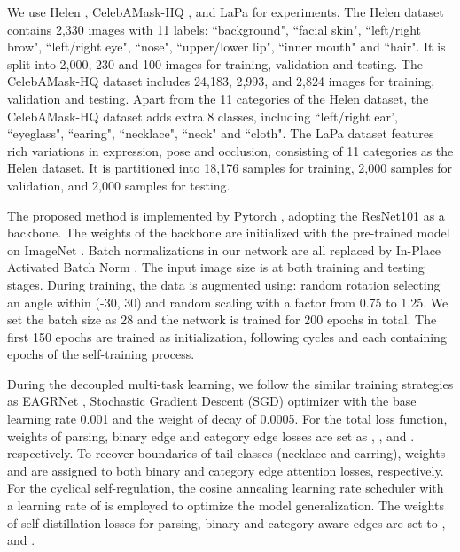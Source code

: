 \documentclass[10pt,twocolumn,letterpaper]{article}
\begin{document}
We use Helen \cite{helen}, CelebAMask-HQ \cite{CelebAMask-HQ}, and LaPa \cite{lapa} for experiments. The Helen dataset contains 2,330 images with 11 labels: ``background", ``facial skin", ``left/right brow", ``left/right eye", ``nose", ``upper/lower lip", ``inner mouth" and ``hair". It is split into 2,000, 230 and 100 images for training, validation and testing. The CelebAMask-HQ dataset includes 24,183, 2,993, and 2,824  images for training, validation and testing. Apart from the 11 categories of the Helen dataset, the CelebAMask-HQ dataset adds extra 8 classes, including ``left/right ear', ``eyeglass", ``earing", ``necklace", ``neck" and ``cloth". The LaPa dataset features rich variations in expression, pose and occlusion, consisting of 11 categories as the Helen dataset. It is partitioned into 18,176 samples for training, 2,000 samples for validation, and 2,000 samples for testing.


The proposed method is implemented by Pytorch \cite{pytorch}, adopting the ResNet101 \cite{resnet101} as a backbone. The weights of the backbone are initialized with the pre-trained model on ImageNet \cite{imagenet}. Batch normalizations in our network are all replaced by In-Place Activated Batch Norm \cite{inplace}. The input image size is  at both training and testing stages. During training, the data is augmented using: random rotation selecting an angle within (-30\textdegree, 30\textdegree) and random scaling with a factor from 0.75 to 1.25. We set the batch size as 28 and the network is trained for 200 epochs in total. The first 150 epochs are trained as initialization, following  cycles and each containing  epochs of the self-training process. 

During the decoupled multi-task learning, we follow the similar training strategies as EAGRNet \cite{te2020edge}, \ie Stochastic Gradient Descent (SGD) optimizer with the base learning rate 0.001 and the weight of decay of 0.0005. For the total loss function, weights of parsing, binary edge and category edge losses are set as , , and . respectively. To recover boundaries of tail classes (\eg necklace and earring), weights  and  are assigned to both binary and category edge attention losses, respectively. For the cyclical self-regulation, the cosine annealing learning rate scheduler \cite{li2020self} with a learning rate of  is employed to optimize the model generalization. The weights of self-distillation losses for parsing, binary and category-aware edges are set to ,  and . 
\end{document}
